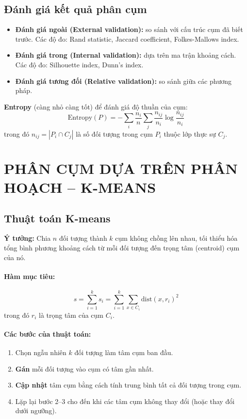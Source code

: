 \documentclass[10pt]{article}
\begin{document}
\subsection{Đánh giá kết quả phân cụm}

\begin{itemize}
    \item \textbf{Đánh giá ngoài (External validation):} so sánh với cấu trúc cụm đã biết trước. Các độ đo: Rand statistic, Jaccard coefficient, Folkes-Mallows index.
    \item \textbf{Đánh giá trong (Internal validation):} dựa trên ma trận khoảng cách. Các độ đo: Silhouette index, Dunn's index.
    \item \textbf{Đánh giá tương đối (Relative validation):} so sánh giữa các phương pháp.
\end{itemize}

\textbf{Entropy} (càng nhỏ càng tốt) để đánh giá độ thuần của cụm:
\[
\text{Entropy}(P) = -\sum_{i} \frac{n_i}{n} \sum_{j} \frac{n_{ij}}{n_i} \log \frac{n_{ij}}{n_i}
\]
trong đó $n_{ij} = |P_i \cap C_j|$ là số đối tượng trong cụm $P_i$ thuộc lớp thực sự $C_j$.

\section{PHÂN CỤM DỰA TRÊN PHÂN HOẠCH -- K-MEANS}

\subsection{Thuật toán K-means}

\textbf{Ý tưởng:} Chia $n$ đối tượng thành $k$ cụm không chồng lên nhau, tối thiểu hóa tổng bình phương khoảng cách từ mỗi đối tượng đến trọng tâm (centroid) cụm của nó.

\paragraph{Hàm mục tiêu:}
\[
s = \sum_{i=1}^{k} s_i = \sum_{i=1}^{k} \sum_{x \in C_i} \text{dist}(x, r_i)^2
\]
trong đó $r_i$ là trọng tâm của cụm $C_i$.

\paragraph{Các bước của thuật toán:}
\begin{enumerate}
    \item Chọn ngẫu nhiên $k$ đối tượng làm tâm cụm ban đầu.
    \item \textbf{Gán} mỗi đối tượng vào cụm có tâm gần nhất.
    \item \textbf{Cập nhật} tâm cụm bằng cách tính trung bình tất cả đối tượng trong cụm.
    \item Lặp lại bước 2--3 cho đến khi các tâm cụm không thay đổi (hoặc thay đổi dưới ngưỡng).
\end{enumerate}
\end{document}
